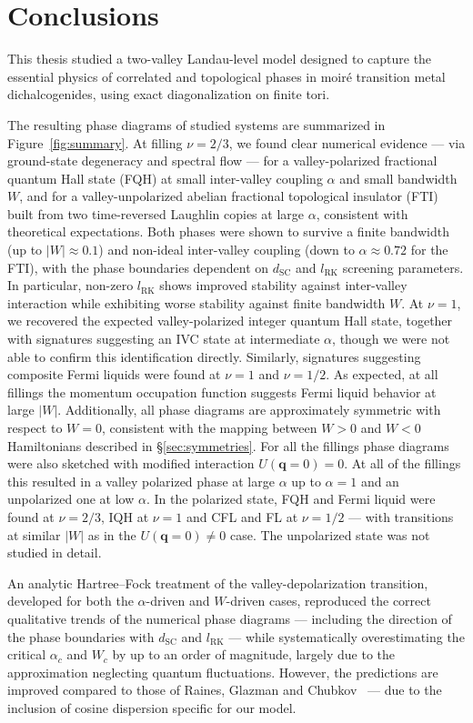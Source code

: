 \section{Conclusions}

This thesis studied a two-valley Landau-level model designed to capture the essential physics of correlated and topological phases in moir\'e transition metal dichalcogenides, using exact diagonalization on finite tori.

The resulting phase diagrams of studied systems are summarized in Figure~\ref{fig:summary}. At filling $\nu = 2/3$, we found clear numerical evidence --- via ground-state degeneracy and spectral flow --- for a valley-polarized fractional quantum Hall state (FQH) at small inter-valley coupling $\alpha$ and small bandwidth $W$, and for a valley-unpolarized abelian fractional topological insulator (FTI) built from two time-reversed Laughlin copies at large $\alpha$, consistent with theoretical expectations. Both phases were shown to survive a finite bandwidth (up to $|W| \approx 0.1$) and non-ideal inter-valley coupling (down to $\alpha \approx 0.72$ for the FTI), with the phase boundaries dependent on $d_{\mathrm{SC}}$ and $l_{\mathrm{RK}}$ screening parameters. In particular, non-zero $l_{\mathrm{RK}}$ shows improved stability against inter-valley interaction while exhibiting worse stability against finite bandwidth $W$. At $\nu = 1$, we recovered the expected valley-polarized integer quantum Hall state, together with signatures suggesting an IVC state at intermediate $\alpha$, though we were not able to confirm this identification directly. Similarly, signatures suggesting composite Fermi liquids were found at $\nu=1$ and $\nu=1/2$. As expected, at all fillings the momentum occupation function suggests Fermi liquid behavior at large $|W|$. Additionally, all phase diagrams are approximately symmetric with respect to $W=0$, consistent with the mapping between $W>0$ and $W<0$ Hamiltonians described in \S\ref{sec:symmetries}. %
For all the fillings phase diagrams were also sketched with modified interaction $U(\mathbf{q} =0) = 0$. At all of the fillings this resulted in a valley polarized phase at large $\alpha$ up to $\alpha=1$ and an unpolarized one at low $\alpha$. In the polarized state, FQH and Fermi liquid were found at $\nu=2/3$, IQH at $\nu = 1$ and CFL and FL at $\nu=1/2$ --- with transitions at similar $|W|$ as in the $U(\mathbf{q} = 0) \neq 0$ case. The unpolarized state was not studied in detail.


An analytic Hartree--Fock treatment of the valley-depolarization transition, developed for both the $\alpha$-driven and $W$-driven cases, reproduced the correct qualitative trends of the numerical phase diagrams --- including the direction of the phase boundaries with $d_{\mathrm{SC}}$ and $l_{\mathrm{RK}}$ --- while systematically overestimating the critical $\alpha_c$ and $W_c$ by up to an order of magnitude, largely due to the approximation neglecting quantum fluctuations. However, the predictions are improved compared to those of Raines, Glazman and Chubkov~\cite{raines2024unconventional} --- due to the inclusion of cosine dispersion specific for our model. %

